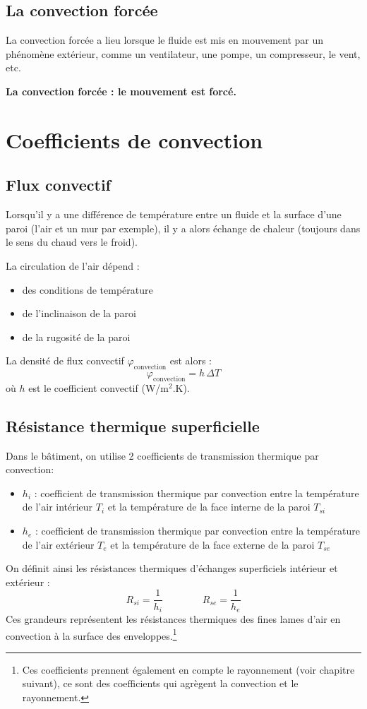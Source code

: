 \subsection*{La convection forcée}
La convection forcée a lieu lorsque le fluide est mis en mouvement par un phénomène extérieur, comme un ventilateur, une pompe, un compresseur, le vent, etc.

\textbf{La convection forcée : le mouvement est forcé.}


\section{Coefficients de convection}

\subsection*{Flux convectif}
Lorsqu'il y a une différence de température entre un fluide et la surface d'une paroi (l'air et un mur par exemple), il y a alors échange de chaleur (toujours dans le sens du chaud vers le froid).

La circulation de l'air dépend :
\begin{itemize}
  \item des conditions de température 
  \item de l'inclinaison de la paroi
  \item de la rugosité de la paroi
\end{itemize}

La densité de flux convectif $\varphi_{\mathrm{convection}}$ est alors :
\begin{equation}
  \varphi_{\mathrm{convection}} = h\,\Delta T
\end{equation}
où $h$ est le coefficient convectif (W/m$^2$.K).

\subsection*{Résistance thermique superficielle}
Dans le bâtiment, on utilise 2 coefficients de transmission thermique par convection:
\begin{itemize}
  \item $h_i$ : coefficient de transmission thermique par convection entre la température de l'air intérieur $T_i$ et la température de la face interne de la paroi $T_{si}$
  \item $h_e$ : coefficient de transmission thermique par convection entre la température de l'air extérieur $T_e$ et la température de la face externe de la paroi $T_{se}$
\end{itemize}
On définit ainsi les résistances thermiques d'échanges superficiels intérieur et extérieur :
\begin{equation}
  R_{si} = \frac{1}{h_i} \qquad\qquad R_{se} = \frac{1}{h_e}
\end{equation}
Ces grandeurs représentent les résistances thermiques des fines lames d'air en convection à la surface des enveloppes.\footnote{Ces coefficients prennent également en compte le rayonnement (voir chapitre suivant), ce sont des coefficients qui agrègent la convection et le rayonnement.}

